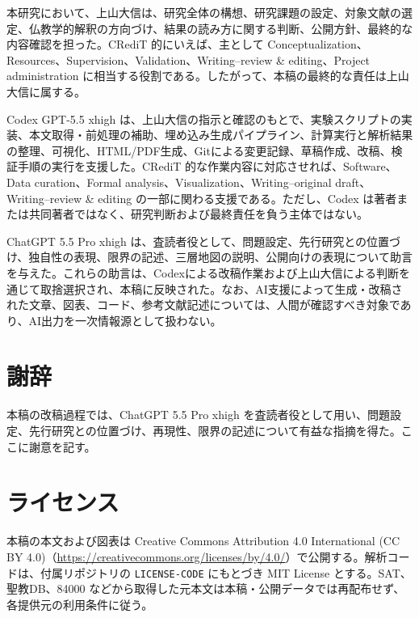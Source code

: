 \documentclass[uplatex,dvipdfmx,11pt,a4paper]{jsarticle}
\begin{document}
本研究において、上山大信は、研究全体の構想、研究課題の設定、対象文献の選定、仏教学的解釈の方向づけ、結果の読み方に関する判断、公開方針、最終的な内容確認を担った。CRediT 的にいえば、主として Conceptualization、Resources、Supervision、Validation、Writing--review \& editing、Project administration に相当する役割である。したがって、本稿の最終的な責任は上山大信に属する。

Codex GPT-5.5 xhigh は、上山大信の指示と確認のもとで、実験スクリプトの実装、本文取得・前処理の補助、埋め込み生成パイプライン、計算実行と解析結果の整理、可視化、HTML/PDF生成、Gitによる変更記録、草稿作成、改稿、検証手順の実行を支援した。CRediT 的な作業内容に対応させれば、Software、Data curation、Formal analysis、Visualization、Writing--original draft、Writing--review \& editing の一部に関わる支援である。ただし、Codex は著者または共同著者ではなく、研究判断および最終責任を負う主体ではない。

ChatGPT 5.5 Pro xhigh は、査読者役として、問題設定、先行研究との位置づけ、独自性の表現、限界の記述、三層地図の説明、公開向けの表現について助言を与えた。これらの助言は、Codexによる改稿作業および上山大信による判断を通じて取捨選択され、本稿に反映された。なお、AI支援によって生成・改稿された文章、図表、コード、参考文献記述については、人間が確認すべき対象であり、AI出力を一次情報源として扱わない。

\section*{謝辞}

本稿の改稿過程では、ChatGPT 5.5 Pro xhigh を査読者役として用い、問題設定、先行研究との位置づけ、再現性、限界の記述について有益な指摘を得た。ここに謝意を記す。

\section*{ライセンス}

本稿の本文および図表は Creative Commons Attribution 4.0 International (CC BY 4.0)（\url{https://creativecommons.org/licenses/by/4.0/}）で公開する。解析コードは、付属リポジトリの \texttt{LICENSE-CODE} にもとづき MIT License とする。SAT、聖教DB、84000 などから取得した元本文は本稿・公開データでは再配布せず、各提供元の利用条件に従う。
\end{document}
